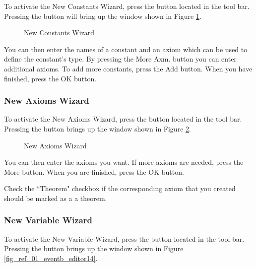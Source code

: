 To activate the \textsf{New Constants Wizard}, press the  button located in the tool bar. Pressing the button will bring up the window shown in Figure \ref{fig_ref_01_eventb_editor6}.

\begin{figure}[!ht]
\begin{center}
	\caption{New Constants Wizard}
	\label{fig_ref_01_eventb_editor6}
\end{center}
\end{figure}

You can then enter the names of a constant and an axiom which can be used to define the constant's type. By pressing the \textsf{More Axm.} button you can enter additional axioms. To add more constants, press the \textsf{Add} button. When you have finished, press the \textsf{OK} button.

\subsubsection{New Axioms Wizard}

To activate the \textsf{New Axioms Wizard}, press the  button located in the tool bar. Pressing the button brings up the window shown in Figure \ref{fig_ref_01_eventb_editor7}.

\begin{figure}[!ht]
\begin{center}
	\caption{New Axioms Wizard}
	\label{fig_ref_01_eventb_editor7}
\end{center}
\end{figure}

You can then enter the axioms you want. If more axioms are needed, press the \textsf{More} button. When you are finished, press the \textsf{OK} button.

Check the ``Theorem" checkbox if the corresponding axiom that you created should be marked as a a theorem.

\subsubsection{New Variable Wizard}

To activate the \textsf{New Variable Wizard}, press the  button located in the tool bar. Pressing the button brings up the window shown in Figure \ref{fig_ref_01_eventb_editor14}.

